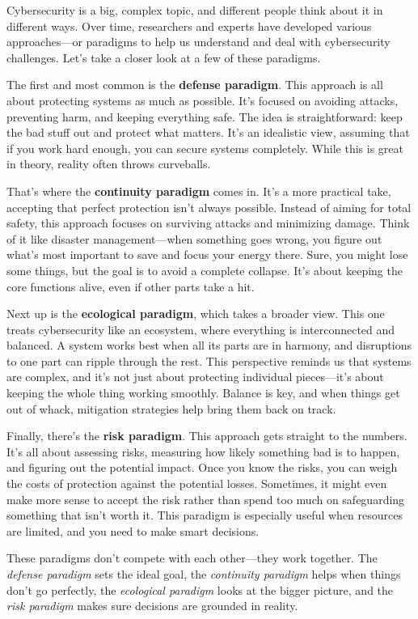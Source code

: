 Cybersecurity is a big, complex topic, and different people think
about it in different ways. Over time, researchers and experts have
developed various approaches—or paradigms to help us understand and
deal with cybersecurity challenges. Let’s take a closer look at a few
of these paradigms.

The first and most common is the \textbf{defense paradigm}. This
approach is all about protecting systems as much as possible. It’s
focused on avoiding attacks, preventing harm, and keeping everything
safe. The idea is straightforward: keep the bad stuff out and protect
what matters. It’s an idealistic view, assuming that if you work hard
enough, you can secure systems completely. While this is great in
theory, reality often throws curveballs.

That’s where the \textbf{continuity paradigm} comes in. It’s a more
practical take, accepting that perfect protection isn’t always
possible. Instead of aiming for total safety, this approach focuses on
surviving attacks and minimizing damage. Think of it like disaster
management—when something goes wrong, you figure out what’s most
important to save and focus your energy there. Sure, you might lose
some things, but the goal is to avoid a complete collapse. It’s about
keeping the core functions alive, even if other parts take a hit.

Next up is the \textbf{ecological paradigm}, which takes a broader view.
This one treats cybersecurity like an ecosystem, where everything is
interconnected and balanced. A system works best when all its parts are
in harmony, and disruptions to one part can ripple through the rest.
This perspective reminds us that systems are complex, and it’s not just
about protecting individual pieces—it’s about keeping the whole thing
working smoothly. Balance is key, and when things get out of whack,
mitigation strategies help bring them back on track.

Finally, there’s the \textbf{risk paradigm}. This approach gets
straight to the numbers. It’s all about assessing risks, measuring how
likely something bad is to happen, and figuring out the potential
impact. Once you know the risks, you can weigh the costs of protection
against the potential losses. Sometimes, it might even make more sense
to accept the risk rather than spend too much on safeguarding something
that isn’t worth it. This paradigm is especially useful when resources
are limited, and you need to make smart decisions.

These paradigms don’t compete with each other—they work together. The
\emph{defense paradigm} sets the ideal goal, the \emph{continuity
paradigm} helps when things don’t go perfectly, the \emph{ecological
paradigm} looks at the bigger picture, and the \emph{risk paradigm}
makes sure decisions are grounded in reality.

